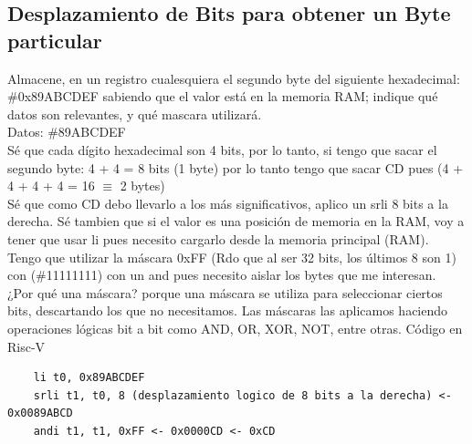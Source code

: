 \documentclass[10pt,a4paper]{article}
\begin{document}
\subsection*{Desplazamiento de Bits para obtener un Byte particular}
\label{subsec:desplazamiento_bits}
Almacene, en un registro cualesquiera el segundo byte del siguiente hexadecimal: \#0x89ABCDEF sabiendo que el valor está en la memoria RAM; indique qué datos son relevantes, y qué mascara utilizará. \\
Datos: \#89ABCDEF \\
Sé que cada dígito hexadecimal son 4 bits, por lo tanto, si tengo que sacar el segundo byte: 4 + 4 = 8 bits (1 byte) por lo tanto tengo que sacar CD pues (4 + 4 + 4 + 4 = 16 $ \equiv $ 2 bytes) \\
Sé que como CD debo llevarlo a los más significativos, aplico un srli 8 bits a la derecha.
Sé tambien que si el valor es una posición de memoria en la RAM, voy a tener que usar li pues necesito cargarlo desde la memoria principal (RAM). \\
Tengo que utilizar la máscara 0xFF (Rdo que al ser 32 bits, los últimos 8 son 1) con (\#11111111) con un and pues necesito aislar los bytes que me interesan. \\
¿Por qué una máscara? porque una máscara se utiliza para seleccionar ciertos bits, descartando los que no necesitamos. Las máscaras las aplicamos haciendo operaciones lógicas bit a bit como AND, OR, XOR, NOT, entre otras.
Código en Risc-V
\begin{lstlisting}
    li t0, 0x89ABCDEF
    srli t1, t0, 8 (desplazamiento logico de 8 bits a la derecha) <- 0x0089ABCD
    andi t1, t1, 0xFF <- 0x0000CD <- 0xCD
\end{lstlisting}
\end{document}
